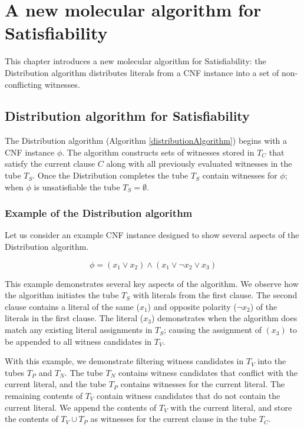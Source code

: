 
\chapter{A new molecular algorithm for {\sc Satisfiability}}

This chapter introduces a new molecular algorithm for {\sc Satisfiability}: the Distribution algorithm distributes literals from a CNF instance into a set of non-conflicting witnesses. 

\section{Distribution algorithm for {\sc Satisfiability}}


The Distribution algorithm (Algorithm \ref{distributionAlgorithm}) begins with a CNF instance $\phi$.  The algorithm constructs sets of witnesses stored in $T_C$ that satisfy the current clause $C$ along with all previously evaluated witnesses in the tube $T_S$.  Once the Distribution completes the tube $T_S$ contain witnesses for $\phi$; when $\phi$ is unsatisfiable the tube $T_S = \emptyset$. \\


\FloatBarrier


	\subsection{Example of the Distribution algorithm}
	\label{exDistribution}

Let us consider an example CNF instance designed to show several aspects of the Distribution algorithm.


\[
	\phi = (x_1 \vee x_2) \wedge (x_1 \vee \neg x_2 \vee x_3)
\]


This example demonstrates several key aspects of the algorithm.  We observe how the algorithm initiates the tube $T_S$  with literals from the first clause.  The second clause contains a literal of the same ($x_1$) and opposite polarity ($\neg x_2$) of the literals in the first clause.  The literal ($x_3$) demonstrates when the algorithm does match any existing literal assignments in $T_S$; causing the assignment of $(x_3)$ to be appended to all witness candidates in $T_V$.

With this example, we demonstrate filtering witness candidates in $T_V$ into the tubes $T_P$ and $T_N$.  The tube $T_N$ contains witness candidates that conflict with the current literal, and the tube $T_P$ contains witnesses for the current literal.  The remaining contents of $T_V$ contain witness candidates that do not contain the current literal.  We append the contents of $T_V$ with the current literal, and store the contents of $T_V \cup T_P$ as witnesses for the current clause in the tube $T_C$.

